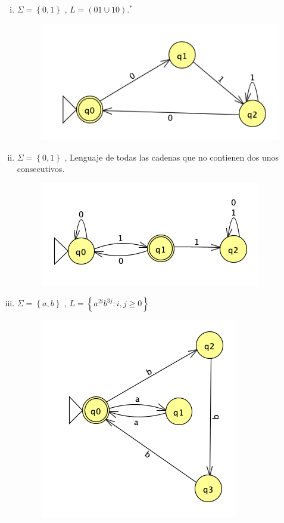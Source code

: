 \documentclass[
	12pt, %
]{fphw}
\begin{document}
\begin{enumerate}
\begin{enumerate}[(i)]
  \item $\Sigma = \left\lbrace 0,1 \right\rbrace$ , $L= \left(01 \cup 10\right).^{*}$ \\
    \begin{figure}[H]
      \centering
      \includegraphics{images/problema_6.png}
    \end{figure}
    \newpage
  \item $\Sigma = \left\lbrace 0,1 \right\rbrace$ , Lenguaje de todas las cadenas que no contienen dos unos consecutivos. \\
    \begin{figure}[H]
      \centering
      \includegraphics{images/problema_7.png}
    \end{figure}
  \item $\Sigma = \left\lbrace a,b \right\rbrace$ , $L= \left\lbrace a^{2i} b^{3j} : i,j \geq 0 \right\rbrace$ \\
    \begin{figure}[H]
      \centering
      \includegraphics{images/problema_8.png}

\end{figure}
\end{enumerate}
\end{enumerate}
\end{document}

